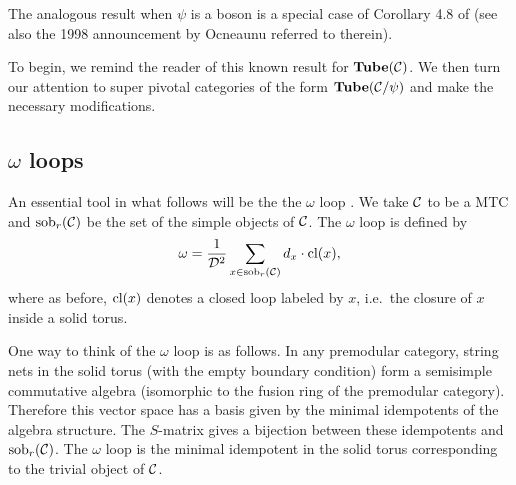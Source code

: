 The analogous result when $\psi$ is a boson is a special case of Corollary 4.8 of \cite{kawahigashi2001}
(see also the 1998 announcement by Ocneaunu referred to therein).

To begin, we remind the reader of this known result for $\textbf{Tube}(\mathcal{C})$.
We then turn our attention to super pivotal categories of the form $\textbf{Tube}(\mathcal{C}/\psi)$ and make the necessary modifications.

\subsection{$\omega$ loops}

An essential tool in what follows will be the the $\omega$ loop \cite{Lins1994}.
We take $\mathcal{C}$ to be a MTC and $\text{sob}_r(\mathcal{C})$ 
be the set of the simple objects of $\mathcal{C}$. 
The $\omega$ loop is defined by
\begin{align}
	\omega  = \frac{1}{\mathcal{D}^2}\sum_{x\in \text{sob}_r(\mathcal{C})} d_x \cdot \text{cl}(x) ,
\label{omega_loop}
\end{align}
where as before, $\text{cl}(x)$ denotes a closed loop labeled by $x$, i.e.\ the closure of $x$ inside a solid torus.

One way to think of the $\omega$ loop is as follows.
In any premodular category,
string nets in the solid torus (with the empty boundary condition) form a semisimple commutative algebra
(isomorphic to the fusion ring of the premodular category).
Therefore this vector space has a basis given by the minimal idempotents of the algebra structure.
The $S$-matrix gives a bijection between these idempotents and $\text{sob}_r(\mathcal{C})$.
The $\omega$ loop is the minimal idempotent in the solid torus corresponding to the trivial object of $\mathcal{C}$.

